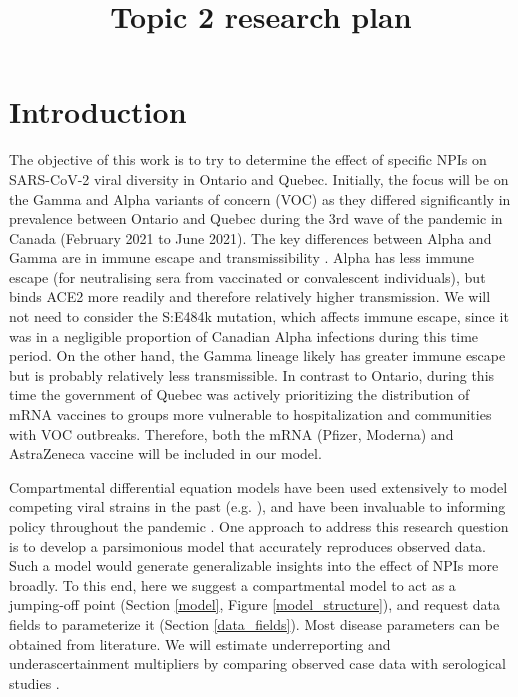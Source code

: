 \documentclass{article}
\begin{document}
\title{Topic 2 research plan}
\maketitle

\section{Introduction}

The objective of this work is to try to determine the effect of specific NPIs on SARS-CoV-2 viral diversity in Ontario and Quebec. Initially, the focus will be on the Gamma and Alpha variants of concern (VOC) as they differed significantly in prevalence between Ontario and Quebec during the 3rd wave of the pandemic in Canada (February 2021 to June 2021). The key differences between Alpha and Gamma are in immune escape and transmissibility \cite{agency_for_clinical_innovation_2022}. Alpha has less immune escape (for neutralising sera from vaccinated or convalescent individuals), but binds ACE2 more readily and therefore relatively higher transmission. We will not need to consider the S:E484k mutation, which affects immune escape, since it was in a negligible proportion of Canadian Alpha infections during this time period. On the other hand, the Gamma lineage likely has greater immune escape but is probably relatively less transmissible. In contrast to Ontario, during this time the government of Quebec was actively prioritizing the distribution of mRNA vaccines to groups more vulnerable to hospitalization and communities with VOC outbreaks. Therefore, both the mRNA (Pfizer, Moderna) and AstraZeneca vaccine will be included in our model.

Compartmental differential equation models have been used extensively to model competing viral strains in the past (e.g. \cite{Alizon_van_Baalen_2008, van_Baalen_Sabelis_1995, Lipsitch_Colijn_Cohen_Hanage_Fraser_2009, Nicoli_Ayabina_Trotter_Turner_Colijn_2015}), and have been invaluable to informing policy throughout the pandemic \cite{Mishra_Berah_Mellan_Unwin_Vollmer_Parag_Gandy_Flaxman_Bhatt_2020,jentsch2021prioritising, bubar2021model}.  One approach to address this research question is to develop a parsimonious model that accurately reproduces observed data. Such a model would generate generalizable insights into the effect of NPIs more broadly. To this end, here we suggest a compartmental model to act as a jumping-off point (Section \ref{model}, Figure \ref{model_structure}), and request data fields to parameterize it (Section \ref{data_fields}). Most disease parameters can be obtained from literature. We will estimate underreporting and underascertainment multipliers by comparing observed case data with serological studies \cite{jentsch2021prioritising}.
\end{document}
